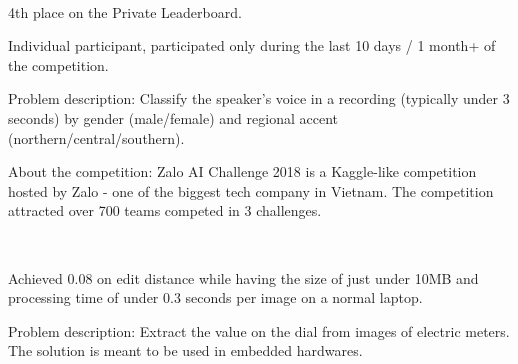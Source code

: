 \\
\begin{xitemize}
    \item 4th place on the Private Leaderboard.
    \item Individual participant, participated only during the last 10 days / 1 month+ of the competition.
    \item Problem description: Classify the speaker's voice in a recording (typically under 3 seconds) by gender
    (male/female) and regional accent (northern/central/southern).
    \item About the competition: Zalo AI Challenge 2018 is a Kaggle-like competition hosted by Zalo - one of the biggest tech company in Vietnam. The competition attracted over 700 teams competed in 3 challenges.
\end{xitemize}

\\
\begin{xitemize}
    \item Achieved 0.08 on edit distance while having the size of just under 10MB and processing time of under 0.3 seconds per image on a normal laptop.
    \item Problem description: Extract the value on the dial from images of electric meters. The solution is meant to be used in embedded hardwares.
\end{xitemize}



